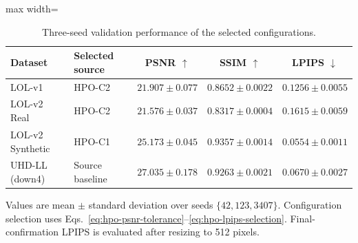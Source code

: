 \begin{table}[t]
  \centering
  \caption{Three-seed validation performance of the selected configurations.}
  \label{tab:retinextapetum-hpo-three-seed}
  \small
  \begin{threeparttable}
    \begin{adjustbox}{max width=\textwidth}
      \begin{tabular}{llccc}
        \toprule
        Dataset & Selected source
          & PSNR $\uparrow$ & SSIM $\uparrow$ & LPIPS $\downarrow$ \\
        \midrule
        LOL-v1
          & HPO-C2
          & $21.907 \pm 0.077$
          & $0.8652 \pm 0.0022$
          & $0.1256 \pm 0.0055$ \\
        LOL-v2 Real
          & HPO-C2
          & $21.576 \pm 0.037$
          & $0.8317 \pm 0.0004$
          & $0.1615 \pm 0.0059$ \\
        LOL-v2 Synthetic
          & HPO-C1
          & $25.173 \pm 0.045$
          & $0.9357 \pm 0.0014$
          & $0.0554 \pm 0.0011$ \\
        UHD-LL (down4)
          & Source baseline
          & $27.035 \pm 0.178$
          & $0.9263 \pm 0.0021$
          & $0.0670 \pm 0.0027$ \\
        \bottomrule
      \end{tabular}
    \end{adjustbox}
    \begin{tablenotes}[flushleft]
      \footnotesize
      \item Values are mean $\pm$ standard deviation over seeds
      $\{42,123,3407\}$. Configuration selection uses
      Eqs.~\eqref{eq:hpo-psnr-tolerance}--\eqref{eq:hpo-lpips-selection}.
      Final-confirmation LPIPS is evaluated after resizing to 512 pixels.
    \end{tablenotes}
  \end{threeparttable}
\end{table}

